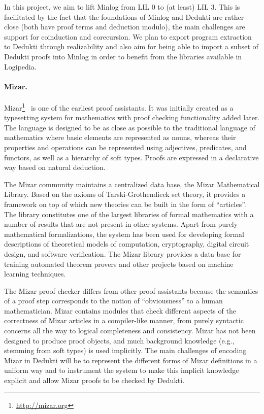In this project, we aim to lift Minlog from LIL $0$ to (at least) LIL $3$.
This is facilitated by the fact that the foundations of Minlog and Dedukti are
rather close (both have proof terms and deduction modulo), the main challenges
are support for coinduction and corecursion. We plan to export program
extraction to Dedukti through realizability and also aim for being able to
import a subset of Dedukti proofs into Minlog in order to benefit from the
libraries available in Logipedia.

\paragraph*{Mizar.}

Mizar\footnote{\url{http://mizar.org}}~\cite{banczerek:mizar} is one of the
earliest proof assistants. It was initially created as a typesetting system for
mathematics with proof checking functionality added later. The language is
designed to be as close as possible to the traditional language of mathematics
where basic elements are represented as nouns, whereas their properties and
operations can be represented using adjectives, predicates, and functors, as
well as a hierarchy of soft types. Proofs are expressed in a declarative way
based on natural deduction.

The Mizar community maintains a centralized data base, the Mizar Mathematical
Library. Based on the axioms of Tarski-Grothendieck set theory, it provides a
framework on top of which new theories can be built in the form of ``articles''.
The library constitutes one of the largest libraries of formal mathematics with
a number of results that are not present in other systems. Apart from purely
mathematical formalizations, the system has been used for developing formal
descriptions of theoretical models of computation, cryptography, digital circuit
design, and software verification. The Mizar library provides a data base for
training automated theorem provers and other projects based on machine learning
techniques.

The Mizar proof checker differs from other proof assistants because the
semantics of a proof step corresponds to the notion of ``obviousness'' to a
human mathematician. Mizar contains modules that check different aspects of the
correctness of Mizar articles in a compiler-like manner, from purely syntactic
concerns all the way to logical completeness and consistency. Mizar has not been
designed to produce proof objects, and much background knowledge (e.g., stemming
from soft types) is used implicitly. The main challenges of encoding Mizar in
Dedukti will be to represent the different forms of Mizar definitions in a
uniform way and to instrument the system to make this implicit knowledge
explicit and allow Mizar proofs to be checked by Dedukti.



